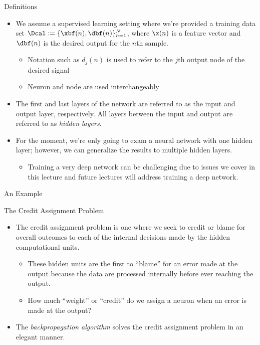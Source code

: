 \documentclass[aspectratio=169,xcolor=dvipsnames,svgnames,x11names,fleqn]{beamer}
\begin{document}
\begin{frame}{Definitions}
\begin{itemize}
    \item We assume a supervised learning setting where we're provided a training data set $\Dcal:= \{\xbf(n), \dbf(n)\}_{n=1}^N$, where $\x(n)$ is a feature vector and $\dbf(n)$ is the desired output for the $n$th sample.
    \begin{itemize}
        \item Notation such as $d_j(n)$ is used to refer to the $j$th output node of the desired signal
        \item Neuron and node are used interchangeably 
    \end{itemize}
    \item The first and last layers of the network are referred to as the input and output layer, respectively. All layers between the input and output are referred to as {\em hidden layers}. 
    \item For the moment, we're only going to exam a neural network with one hidden layer; however, we can generalize the results to multiple hidden layers. 
    \begin{itemize}
        \item Training a very deep network can be challenging due to issues we cover in this lecture and future lectures will address training a deep network. 
    \end{itemize}
\end{itemize}
\end{frame}


\begin{frame}{An Example}
\begin{talert}{The Credit Assignment Problem}
\begin{itemize}
    \item The {\color{MediumBlue}credit assignment problem} is one where we seek to credit or blame for overall outcomes to each of the internal decisions made by the hidden computational units. 
    \begin{itemize}
        \item These hidden units are the first to ``blame'' for an error made at the output because the data are processed internally before ever reaching the output. 
        \item How much ``weight'' or ``credit'' do we assign a neuron when an error is made at the output? 
    \end{itemize}
    \item The {\em \color{MediumRed}backpropagation algorithm} solves the credit assignment problem in an elegant manner. 
\end{itemize}
\end{talert}
\end{frame}
\end{document}
